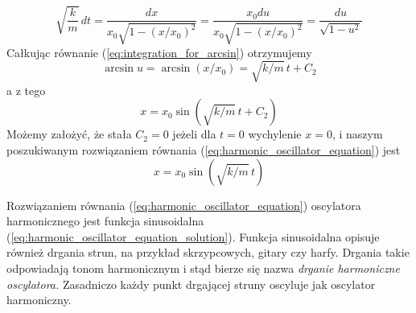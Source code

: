 \documentclass[12pt,a4paper,pl,fleqn]{article}
\begin{document}
\begin{equation}
\label{eq:integration_for_arcsin}
       \sqrt{\frac{k}{m}} \,  d t  =  \frac{d x}{ x_{0} \sqrt{ 1 - \left( x/x_{0} \right)^2 } }
       = \frac{x_{0} du}{ x_{0} \sqrt{ 1 - \left( x/x_{0} \right)^2 } }
       =  \frac{d u}{ \sqrt{ 1 - u^{2}} }
\end{equation}
Całkując równanie (\ref{eq:integration_for_arcsin}) otrzymujemy
\begin{equation}
    \arcsin u =  \arcsin(x/x_{0}) =  \sqrt{k/m} \,   t + C_{2}
\end{equation}
a z tego
\begin{equation}
    x = x_{0} \sin(\sqrt{k/m} \,   t + C_{2})
\end{equation}
Możemy założyć, że stała $C_{2} = 0$ jeżeli dla $t = 0$ wychylenie $x = 0$, i naszym poszukiwanym rozwiązaniem
równania (\ref{eq:harmonic_oscillator_equation}) jest
\begin{equation}
\label{eq:harmonic_oscillator_equation_solution}
    x = x_{0} \sin(\sqrt{k/m} \, t)
\end{equation}



Rozwiązaniem równania (\ref{eq:harmonic_oscillator_equation}) oscylatora harmonicznego
jest funkcja sinusoidalna (\ref{eq:harmonic_oscillator_equation_solution})\@. 
Funkcja sinusoidalna opisuje również drgania strun, na przykład skrzypcowych, gitary czy harfy.
Drgania takie odpowiadają tonom harmonicznym i stąd bierze się nazwa {\em drganie harmoniczne oscylatora.\/}
Zasadniczo każdy punkt drgającej struny oscyluje jak oscylator harmoniczny.
\end{document}
